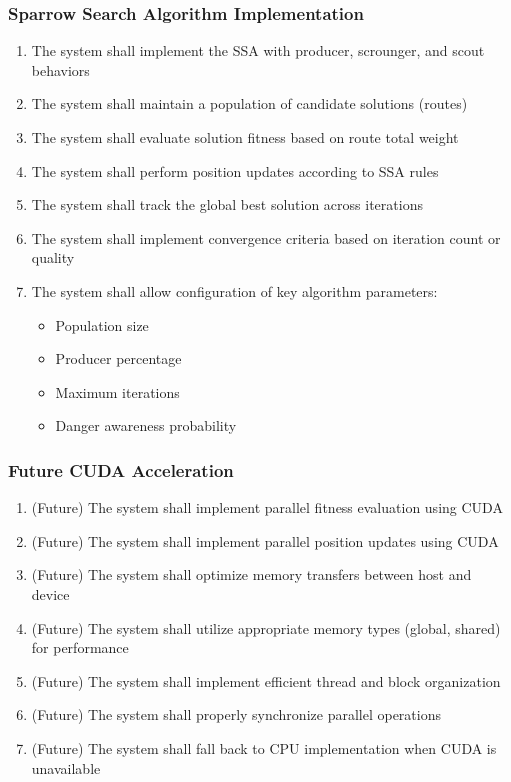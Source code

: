 \documentclass[conference]{IEEEtran}
\begin{document}
\subsubsection{Sparrow Search Algorithm Implementation}
\begin{enumerate}
    \item The system shall implement the SSA with producer, scrounger, and scout behaviors
    \item The system shall maintain a population of candidate solutions (routes)
    \item The system shall evaluate solution fitness based on route total weight
    \item The system shall perform position updates according to SSA rules
    \item The system shall track the global best solution across iterations
    \item The system shall implement convergence criteria based on iteration count or quality
    \item The system shall allow configuration of key algorithm parameters:
    \begin{itemize}
        \item Population size
        \item Producer percentage
        \item Maximum iterations
        \item Danger awareness probability
    \end{itemize}
\end{enumerate}

\subsubsection{Future CUDA Acceleration}
\begin{enumerate}
    \item (Future) The system shall implement parallel fitness evaluation using CUDA
    \item (Future) The system shall implement parallel position updates using CUDA
    \item (Future) The system shall optimize memory transfers between host and device
    \item (Future) The system shall utilize appropriate memory types (global, shared) for performance
    \item (Future) The system shall implement efficient thread and block organization
    \item (Future) The system shall properly synchronize parallel operations
    \item (Future) The system shall fall back to CPU implementation when CUDA is unavailable
\end{enumerate}
\end{document}
